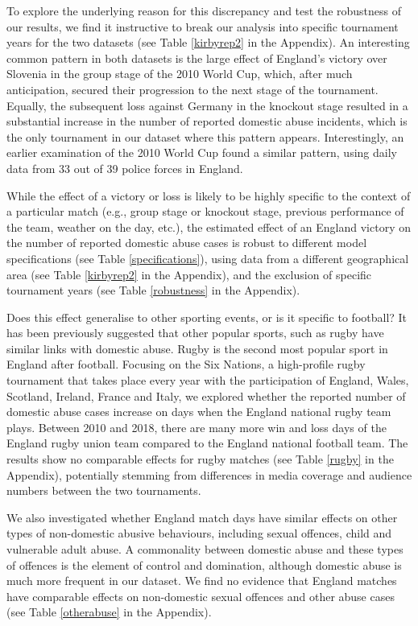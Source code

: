 \documentclass[12pt, letterpaper]{article}
\begin{document}
To explore the underlying reason for this discrepancy and test the robustness of our results, we find it instructive to break our analysis into specific tournament years for the two datasets (see Table \ref{kirbyrep2} in the Appendix). An interesting common pattern in both datasets is the large effect of England's victory over Slovenia in the group stage of the 2010 World Cup, which, after much anticipation, secured their progression to the next stage of the tournament. Equally, the subsequent loss against Germany in the knockout stage resulted in a substantial increase in the number of reported domestic abuse incidents, which is the only tournament in our dataset where this pattern appears. Interestingly, an earlier examination of the 2010 World Cup found a similar pattern, using daily data from 33 out of 39 police forces in England\autocite{Brimicombe2012}.


While the effect of a victory or loss is likely to be highly specific to the context of a particular match (e.g., group stage or knockout stage, previous performance of the team, weather on the day, etc.), the estimated effect of an England victory on the number of reported domestic abuse cases is robust to different model specifications (see Table \ref{specifications}), using data from a different geographical area (see Table \ref{kirbyrep2} in the Appendix), and the exclusion of specific tournament years (see Table \ref{robustness} in the Appendix). 

Does this effect generalise to other sporting events, or is it specific to football?
It has been previously suggested that other popular sports, such as rugby have similar links with domestic abuse\autocite{Brooks-Hay2018}. Rugby is the second most popular sport in England after football\autocite{Ipsos2003}. Focusing on the Six Nations, a high-profile rugby tournament that takes place every year with the participation of England, Wales, Scotland, Ireland, France and Italy, we explored whether the reported number of domestic abuse cases increase on days when the England national rugby team plays. Between 2010 and 2018, there are many more win and loss days of the England rugby union team compared to the England national football team. The results show no comparable effects for rugby matches (see Table \ref{rugby} in the Appendix), potentially stemming from differences in media coverage and audience numbers between the two tournaments. 

We also investigated whether England match days have similar effects on other types of non-domestic abusive behaviours, including sexual offences, child and vulnerable adult abuse. A commonality between domestic abuse and these types of offences is the element of control and domination, although domestic abuse is much more frequent in our dataset. We find no evidence that England matches have comparable effects on non-domestic sexual offences and other abuse cases (see Table \ref{otherabuse} in the Appendix). 
\end{document}
